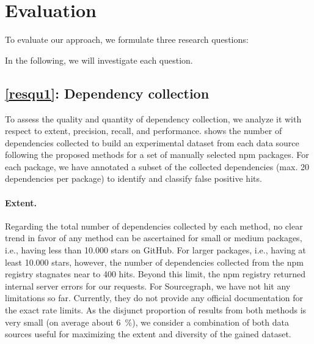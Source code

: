 \documentclass[a4paper,twoside]{article}
\begin{document}
\section{Evaluation}
\label{sec:evaluation}

To evaluate our approach, we formulate three research questions:

%
In the following, we will investigate each question.

\subsection{\ref{resqu1}: Dependency collection}
\label{sec:evaluation/resqu1}

To assess the quality and quantity of dependency collection, we analyze it with respect to extent, precision, recall, and performance.
 shows the number of dependencies collected to build an experimental dataset from each data source following the proposed methods for a set of manually selected npm packages.
For each package, we have annotated a subset of the collected dependencies (max. 20 dependencies per package) to identify and classify false positive hits.



\paragraph{Extent.}
\label{sec:evaluation/resqu1/extent}

Regarding the total number of dependencies collected by each method, no clear trend in favor of any method can be ascertained for small or medium packages, i.e., having less than \num{10,000} stars on GitHub.
For larger packages, i.e., having at least \num{10,000} stars, however, the number of dependencies collected from the npm registry stagnates near to 400 hits.
Beyond this limit, the npm registry returned internal server errors for our requests.
For Sourcegraph, we have not hit any limitations so far.
Currently, they do not provide any official documentation for the exact rate limits.
%
As the disjunct proportion of results from both methods is very small (on average about \SI{6}{\percent}), we consider a combination of both data sources useful for maximizing the extent and diversity of the gained dataset.
\end{document}
